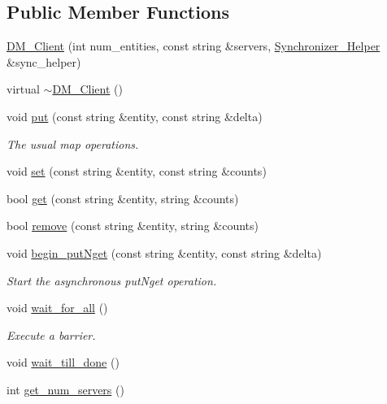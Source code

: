 \subsection*{Public Member Functions}
\begin{DoxyCompactItemize}
\item 
\hyperlink{class_d_m___client_a4366fbc81789bd7b4ba0f681ad4b7c0e}{DM\_\-Client} (int num\_\-entities, const string \&servers, \hyperlink{class_synchronizer___helper}{Synchronizer\_\-Helper} \&sync\_\-helper)
\item 
virtual \hyperlink{class_d_m___client_a7c4036aa31873a238dca15210d4c15bc}{$\sim$DM\_\-Client} ()
\item 
void \hyperlink{class_d_m___client_a8285b5edb01bfe9325d887a4bb4e17d7}{put} (const string \&entity, const string \&delta)
\begin{DoxyCompactList}\small\item\em The usual map operations. \item\end{DoxyCompactList}\item 
void \hyperlink{class_d_m___client_aebf92e20f8ae0517bee2c956593f3748}{set} (const string \&entity, const string \&counts)
\item 
bool \hyperlink{class_d_m___client_aef212e65cee0c1cd11f9480e68f923cd}{get} (const string \&entity, string \&counts)
\item 
bool \hyperlink{class_d_m___client_a856f11737f8dce9f842256a3391b084b}{remove} (const string \&entity, string \&counts)
\item 
void \hyperlink{class_d_m___client_a55c5ec85e4e670a6ec5a4da71e4d50cf}{begin\_\-putNget} (const string \&entity, const string \&delta)
\begin{DoxyCompactList}\small\item\em Start the asynchronous putNget operation. \item\end{DoxyCompactList}\item 
void \hyperlink{class_d_m___client_a93c89b66097d58302c1322918ec76fca}{wait\_\-for\_\-all} ()
\begin{DoxyCompactList}\small\item\em Execute a barrier. \item\end{DoxyCompactList}\item 
void \hyperlink{class_d_m___client_a2ea7e411fb8e92febc74c90b8ab886c6}{wait\_\-till\_\-done} ()
\item 
int \hyperlink{class_d_m___client_a6064058c7470f12b8825b1482db08331}{get\_\-num\_\-servers} ()
\end{DoxyCompactItemize}


